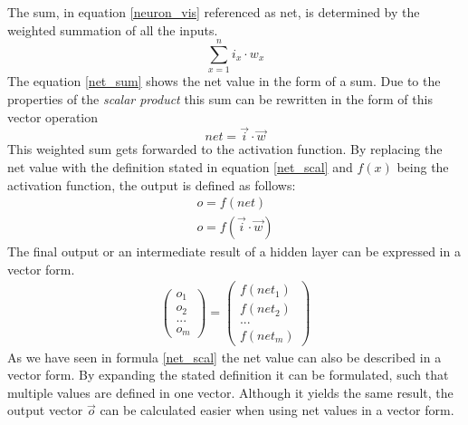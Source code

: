 \documentclass[12pt]{article}
\begin{document}
The sum, in equation \ref{neuron_vis} referenced as net, is determined by the weighted summation of all the inputs. 
\begin{equation}
  \sum_{x = 1}^{n} i_{x} \cdot w_{x}  
  \label{net_sum}
\end{equation}
The equation \ref{net_sum} shows the net value in the form of a sum.
Due to the properties of the \textit{scalar product} this sum can be rewritten in the form of this vector operation
\begin{equation}
net = \vec{i} \cdot \vec{w}
\label{net_scal}
\end{equation}
This weighted sum gets forwarded to the activation function. By replacing the net value with the definition stated in equation \ref{net_scal}  and $f(x)$ being the activation function, the output is defined as follows:
\begin{equation}
\begin{gathered}
       o = f(net)\\
    o = f(\vec{i} \cdot \vec{w}) 
\end{gathered}
\end{equation}
The final output or an intermediate result of a hidden layer can be expressed in a vector form.
\begin{equation}
\begin{gathered}
      \begin{pmatrix}
o_{1}\\ 
o_{2}\\ 
...\\ 
o_{m}
\end{pmatrix} = \begin{pmatrix}
f(net_{1})\\ 
f(net_{2})\\ 
...\\ 
f(net_{m})
\end{pmatrix}
\end{gathered}
\end{equation}
As we have seen in formula \ref{net_scal} the net value can also be described in a vector form. By expanding the stated definition it can be formulated, such that multiple values are defined in one vector. Although it yields the same result, the output vector $\vec{o}$ can be calculated easier when using net values in a vector form.
\end{document}
